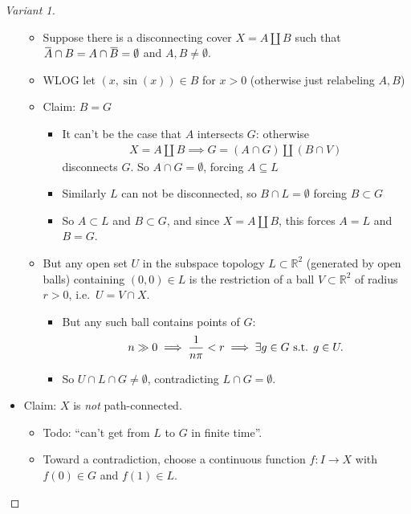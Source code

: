\begin{solution}
\begin{proof}[Variant 1]
\begin{itemize}
  \begin{itemize}
  \tightlist
  \item
    Suppose there is a disconnecting cover \(X = A{\coprod}B\) such that
    \(\mkern 1.5mu\overline{\mkern-1.5muA\mkern-1.5mu}\mkern 1.5mu \cap B = A\cap\mkern 1.5mu\overline{\mkern-1.5muB\mkern-1.5mu}\mkern 1.5mu = \emptyset\)
    and \(A, B \neq \emptyset\).
  \item
    WLOG let \((x, \sin(x))\in B\) for \(x>0\) (otherwise just
    relabeling \(A, B\))
  \item
    Claim: \(B = G\)

    \begin{itemize}
    \tightlist
    \item
      It can't be the case that \(A\) intersects \(G\): otherwise
      \begin{align*}X = A{\coprod}B \implies G = (A\cap G) {\coprod}(B \cap V)\end{align*}
      disconnects \(G\). So \(A\cap G = \emptyset\), forcing
      \(A \subseteq L\)
    \item
      Similarly \(L\) can not be disconnected, so
      \(B\cap L = \emptyset\) forcing \(B \subset G\)
    \item
      So \(A \subset L\) and \(B\subset G\), and since
      \(X = A{\coprod}B\), this forces \(A = L\) and \(B = G\).
    \end{itemize}
  \item
    But any open set \(U\) in the subspace topology
    \(L\subset {\mathbb{R}}^2\) (generated by open balls) containing
    \((0, 0) \in L\) is the restriction of a ball
    \(V \subset {\mathbb{R}}^2\) of radius \(r>0\),
    i.e.~\(U = V \cap X\).

    \begin{itemize}
    \tightlist
    \item
      But any such ball contains points of \(G\):
      \begin{align*}n\gg 0 \implies {1 \over n\pi} < r \implies \exists g\in G \text{ s.t. } g\in U.\end{align*}
    \item
      So \(U \cap L \cap G \neq \emptyset\), contradicting
      \(L\cap G = \emptyset\).
    \end{itemize}
  \end{itemize}
\item
  Claim: \(X\) is \emph{not} path-connected.

  \begin{itemize}
  \item
    Todo: ``can't get from \(L\) to \(G\) in finite time''.
  \item
    Toward a contradiction, choose a continuous function \(f:I \to X\)
    with \(f(0) \in G\) and \(f(1) \in L\).


\end{itemize}
\end{itemize}
\end{proof}
\end{solution}
